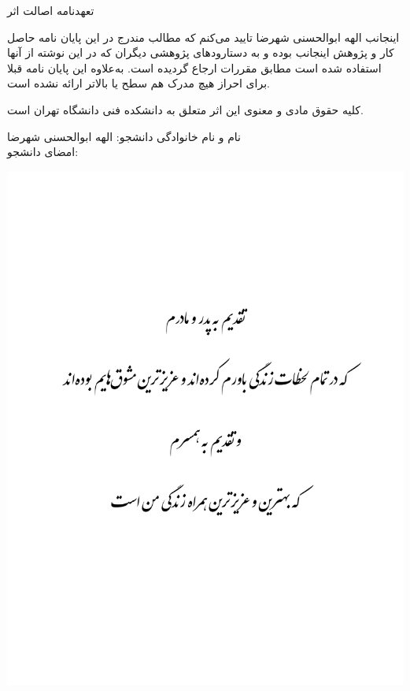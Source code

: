 \documentclass[twoside, a4paper,11pt]{book}
\numberwithin{equation}{chapter}
\numberwithin{table}{chapter}
\numberwithin{figure}{chapter}
\numberwithin{equation}{chapter}
\begin{document}
\newpage
\thispagestyle{empty}
\mbox{}

\newpage
\thispagestyle{empty}
{ \LARGE 
\begin{center}
تعهدنامه اصالت اثر
\end{center}}
اینجانب الهه ابوالحسنی شهرضا تایید می‌کنم که مطالب مندرج در این پایان نامه حاصل کار و پژوهش اینجانب بوده و به دستارود‌های پژوهشی دیگران که در این نوشته از آنها استفاده شده است مطابق مقررات ارجاع گردیده است. به‌علاوه این پایان نامه قبلا برای احراز هیچ مدرک هم سطح یا بالاتر ارائه نشده است.
\par
کلیه حقوق مادی و معنوی این اثر متعلق به دانشکده فنی دانشگاه تهران است.
\par 
\vskip 2cm


\begin{flushleft}
نام و نام خانوادگی دانشجو: الهه ابوالحسنی شهرضا \hspace{1.75cm}~~~~~~~ \\
امضای دانشجو: ~~~~~~~~~~~~~~~~~~~~~~~~~~~~~~~~~~~~~~~~~~~~~~~~~~~~~
\end{flushleft}

\newpage
\thispagestyle{empty}
\mbox{}


\newpage
\thispagestyle{empty}
\mbox{}
\includegraphics[scale=1, center]{docs/taghdir.pdf} 
\end{document}
